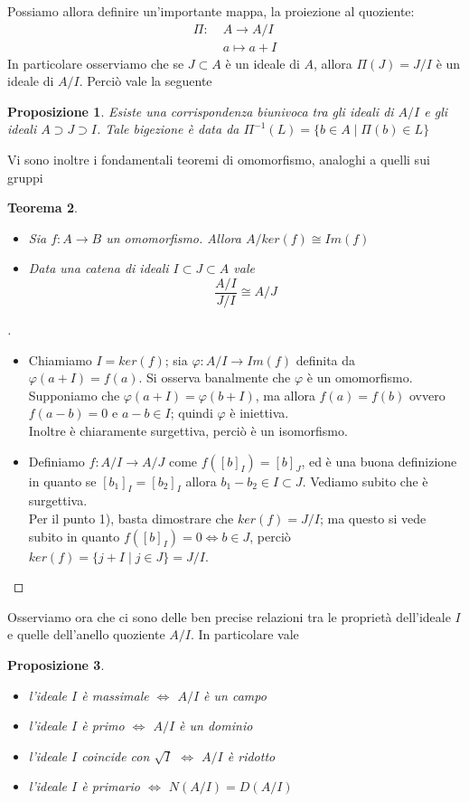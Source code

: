 \documentclass[a4paper,10pt]{article}
\theoremstyle{plain}
\newtheorem{thm}{Teorema}[section]
\newtheorem{prop}[thm]{Proposizione}
\theoremstyle{definition}
\newenvironment{myproof}[1][\proofname]{%
  \begin{proof}[#1]$ $\par\nobreak\ignorespaces
}{%
  \qedhere
  \end{proof}
}
\begin{document}
Possiamo allora definire un'importante mappa, la proiezione al quoziente:
\begin{align*}
    \Pi:\;&A\to A/I \\ &a\mapsto a+I
\end{align*}
In particolare osserviamo che se $J\subset A$ è un ideale di $A$, allora $\Pi(J)=J/I$ è un ideale di $A/I$. Perciò vale la seguente
\begin{prop}
    Esiste una corrispondenza biunivoca tra gli ideali di $A/I$ e gli ideali $A\supset J\supset I$. Tale bigezione è data da $\Pi^{-1}(L)=\{b\in A\mid \Pi(b)\in L\}$
\end{prop}
Vi sono inoltre i fondamentali teoremi di omomorfismo, analoghi a quelli sui gruppi
\begin{thm}
    $ $
    \begin{itemize}
        \item[1)] Sia $f:A\to B$ un omomorfismo. Allora $A/ker(f)\cong Im(f)$
        \item[2)] Data una catena di ideali $I\subset J\subset A$ vale $$ \frac{A/I}{J/I}\cong A/J$$
    \end{itemize}
\end{thm}
\begin{myproof}
    \begin{itemize}
        \item[1)] Chiamiamo $I=ker(f)$; sia $\varphi: A/I\to Im(f)$ definita da $\varphi(a+I)=f(a)$. Si osserva banalmente che $\varphi$ è un omomorfismo.\\
        Supponiamo che $\varphi(a+I)=\varphi(b+I)$, ma allora $f(a)=f(b)$ ovvero $f(a-b)=0$ e $a-b\in I$; quindi $\varphi$ è iniettiva.\\
        Inoltre è chiaramente surgettiva, perciò è un isomorfismo.
        \item[2)] Definiamo $f: A/I\to A/J$ come $f([b]_I)=[b]_J$, ed è una buona definizione in quanto se $[b_1]_I=[b_2]_I$ allora $b_1-b_2\in I\subset J$. Vediamo subito che è surgettiva.\\
        Per il punto 1), basta dimostrare che $ker(f)=J/I$; ma questo si vede subito in quanto $f([b]_I)=0\iff b\in J$, perciò $ker(f)= \{ j+I\mid j\in J\}=J/I$.

    \end{itemize}
\end{myproof}

Osserviamo ora che ci sono delle ben precise relazioni tra le proprietà dell'ideale $I$ e quelle dell'anello quoziente $A/I$. In particolare vale
\begin{prop}
    $ $
    \begin{itemize}
        \item l'ideale $I$ è massimale $\iff$ $A/I$ è un campo
        \item l'ideale $I$ è primo $\iff$ $A/I$ è un dominio
        \item l'ideale $I$ coincide con $\sqrt I$ $\iff$ $A/I$ è ridotto
        \item l'ideale $I$ è primario $\iff$ $N(A/I)=D(A/I)$
    \end{itemize}
\end{prop}
\end{document}
